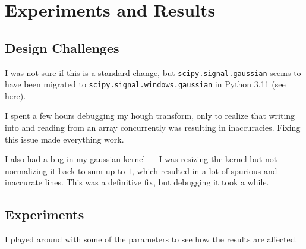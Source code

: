 \section{Experiments and Results}

\subsection{Design Challenges}
\begin{enumroman}
  \item I was not sure if this is a standard change,
    but \lstinline{scipy.signal.gaussian} seems to have been
    migrated to \lstinline{scipy.signal.windows.gaussian}
    in Python 3.11 (see \href{https://docs.scipy.org/doc/scipy/reference/generated/scipy.signal.windows.gaussian.html}{here}).
  \item I spent a few hours debugging my hough transform,
    only to realize that writing into and reading from
    an array concurrently was resulting in
    inaccuracies.
    Fixing this issue made everything work.
  \item I also had a bug in my gaussian kernel
     --- I was resizing the kernel but not normalizing it
    back to sum up to $1$, which resulted in
    a lot of spurious and inaccurate lines.
    This was a definitive fix, but debugging it took a while.
\end{enumroman}

\subsection{Experiments}

I played around with some of the parameters to see how the results
are affected.

